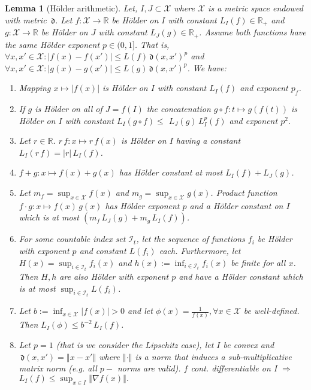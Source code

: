 \documentclass{article} %
\newtheorem{lem}[thm]{Lemma}
\theoremstyle{definition}
\theoremstyle{remark}
\newcommand{\norm}[1]{\left\Vert#1\right\Vert}
\newcommand{\abs}[1]{\left\vert#1\right\vert}
\newcommand{\Real}{\mathbb R}
\newcommand{\inspace}{\ensuremath{ \mathcal X}}
\newcommand{\indsett}{\ensuremath{ {\mathcal I_{t}}}}
\newcommand{\metric}{\, \mathfrak{d}} %
\begin{document}
\begin{lem}[H\"older arithmetic] \label{lem:Hoeldarithmetic}
Let, $I,J \subset \inspace$ where $\inspace$ is a metric space endowed with metric $\metric$. Let $f : \inspace \to \Real$ be H\"older on $I$ with constant $L_I (f) \in \Real_+$ 
and $g :\inspace \to \Real$ be H\"older on $J$ with constant $L_J (g) \in \Real_+$. Assume both functions have the same H\"older exponent $p \in (0,1]$. That is, $\forall x, x' \in \inspace: \abs{f(x)-f(x')} \leq L(f) \metric(x,x')^p$ and  $\forall x, x' \in \inspace: \abs{g(x)-g(x')} \leq L(g)  \metric(x,x')^p$.
We have:

\begin{enumerate}
	\item Mapping $x \mapsto |f(x)|$ is H\"older on $I$ with constant $L_I(f)$ and exponent $p_f$.
	\item If $g$ is H\"older on all of $J=f(I)$ the concatenation $g \circ f: t \mapsto g(f(t))$ is H\"older on $I$ with constant 
	      $L_I(g \circ f) \leq$ $L_J (g) \, L_I^p(f)$ and exponent $p^2$.
	\item Let $r \in \Real$. $r \, f: x \mapsto r \, f(x)$ is H\"older on $I$ having a constant $L_I (r \,f) = |r| \, L_I(f)$.
	\item $f+g: x \mapsto f(x) + g(x)$ has H\"older constant at most $L_I(f) + L_J(g)$.
	\item Let $m_f = \sup_{x\in \inspace } f(x)$ and $m_g = \sup_{x \in \inspace } g(x)$. Product function $f\cdot g: x \mapsto f(x) \, g(x)$ has H\"older exponent $p$ and a H\"older constant on $I$ which is at most $(m_f \, L_J(g)+ m_g \, L_I(f))$.
	\item For some countable index set $\indsett$, let the sequence of functions $f_i$ be H\"older with exponent $p$ and constant $L(f_i)$ each. Furthermore, let $H(x) =\sup_{i \in \indsett} f_i(x) $ and $h(x) := \inf_{i \in \indsett} f_i(x)$ be finite for all $x$. Then $H,h$ are also H\"older with exponent $p$ and have a H\"older constant which is at most $\sup_{i \in \indsett} L(f_i)$.
	\item Let $b := \inf_{x \in \inspace }| f(x)| > 0$ and let 
	$\phi(x) = \frac{1}{f(x)}, \forall x \in \inspace$ be well-defined.  
	      Then $L_I(\phi) \leq b^{-2} \, L_I(f)$.  
	\item Let $p=1$ (that is we consider the Lipschitz case), let $I$ be convex and $\metric(x,x') = \norm{x-x'}$ where $\norm{\cdot}$ is a norm that induces a sub-multiplicative matrix norm (e.g. all $p-$ norms are valid). $f$ cont. differentiable on I $\Rightarrow$ $L_I(f) \leq \sup_{x \in I } \norm{\nabla f(x)}. $ 

\end{enumerate}
\end{lem}
\end{document}

